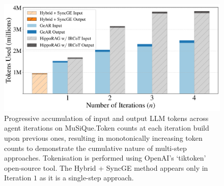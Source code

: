 \begin{figure}[thbp]
  \includegraphics[width=\linewidth]{figures/experiments/tokens_vs_agent_iters_input_output.pdf}
  \caption{Progressive accumulation of input and output LLM tokens across agent iterations on MuSiQue.Token counts at each iteration build upon previous ones, resulting in monotonically increasing token counts to demonstrate the cumulative nature of multi-step approaches. Tokenisation is performed using OpenAI's `tiktoken' open-source tool. The Hybrid + SyncGE method appears only in Iteration $1$ as it is a single-step approach.}
\label{fig:token_comparison_input_output}
\end{figure}
